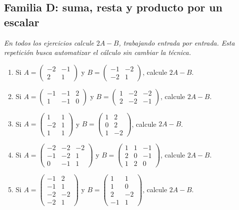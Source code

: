 \documentclass[12pt]{article}
\theoremstyle{remark}
\newcounter{contadorEjercicio}
\newenvironment{listaejercicios}{\begin{enumerate}[label=\textbf{E\arabic*.},leftmargin=2.4em,itemsep=0.52em]\setcounter{enumi}{\value{contadorEjercicio}}}{\setcounter{contadorEjercicio}{\value{enumi}}\end{enumerate}}
\begin{document}
\subsection{Familia D: suma, resta y producto por un escalar}\noindent\textit{En todos los ejercicios calcule $2A-B$, trabajando entrada por entrada. Esta repetición busca automatizar el cálculo sin cambiar la técnica.}\par\medskip
\begin{listaejercicios}

\item Si $A=\begin{pmatrix}-2&-1\\2&1\end{pmatrix}$ y $B=\begin{pmatrix}-1&-2\\-2&1\end{pmatrix}$, calcule $2A-B$.

\item Si $A=\begin{pmatrix}-1&-1&2\\1&-1&0\end{pmatrix}$ y $B=\begin{pmatrix}1&-2&-2\\2&-2&-1\end{pmatrix}$, calcule $2A-B$.

\item Si $A=\begin{pmatrix}1&1\\-2&1\\1&1\end{pmatrix}$ y $B=\begin{pmatrix}1&2\\0&2\\1&-2\end{pmatrix}$, calcule $2A-B$.

\item Si $A=\begin{pmatrix}-2&-2&-2\\-1&-2&1\\0&-1&1\end{pmatrix}$ y $B=\begin{pmatrix}1&1&-1\\2&0&-1\\1&2&0\end{pmatrix}$, calcule $2A-B$.

\item Si $A=\begin{pmatrix}-1&2\\-1&1\\-2&-2\\-2&1\end{pmatrix}$ y $B=\begin{pmatrix}1&1\\1&0\\2&-2\\-1&1\end{pmatrix}$, calcule $2A-B$.


\end{listaejercicios}
\end{document}
